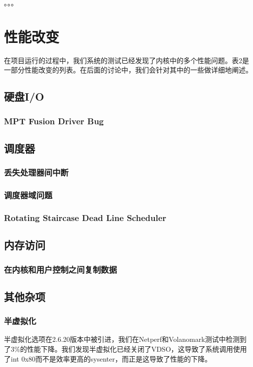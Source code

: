 \documentclass[CJK,12pt,a4paper]{article}
\begin{document}
。。。


\section{性能改变}
在项目运行的过程中，我们系统的测试已经发现了内核中的多个性能问题。表2是一部分性能改变的列表。在后面的讨论中，我们会针对其中的一些做详细地阐述。
\subsection{硬盘I/O}
\subsubsection{MPT Fusion Driver Bug}
\subsection{调度器}
\subsubsection{丢失处理器间中断}
\subsubsection{调度器域问题}
\subsubsection{Rotating Staircase Dead Line Scheduler}
\subsection{内存访问}
\subsubsection{在内核和用户控制之间复制数据}
\subsection{其他杂项}
\subsubsection{半虚拟化}
半虚拟化选项在2.6.20版本中被引进，我们在Netperf和Volanomark测试中检测到了3\%的性能下降。我们发现半虚拟化已经关闭了VDSO，这导致了系统调用使用了int 0x80而不是效率更高的sysenter，而正是这导致了性能的下降。
\end{document}

